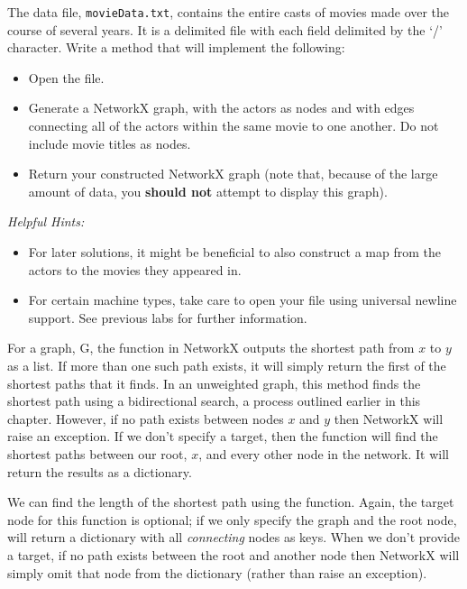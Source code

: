 \begin{problem}
The data file, \texttt{movieData.txt}, contains the entire casts of movies made over the course of several years. It is a delimited file with each field delimited by the `/' character. Write a method that will implement the following:
\begin{itemize}
\item Open the file.
\item Generate a NetworkX graph, with the actors as nodes and with edges connecting all of the actors within the same movie to one another. Do not include movie titles as nodes.
\item Return your constructed NetworkX graph (note that, because of the large amount of data, you \textbf{should not} attempt to display this graph).
\end{itemize}
\emph{Helpful Hints:}
\begin{itemize}
\item For later solutions, it might be beneficial to also construct a map from the actors to the movies they appeared in.
\item For certain machine types, take care to open your file using universal newline support. See previous labs for further information.
\end{itemize}
\end{problem}

For a graph, G, the  function in NetworkX outputs
the shortest path from $x$ to $y$ as a list. If more than one such path exists,
it will simply return the first of the shortest paths that it finds. In an
unweighted graph, this method finds the shortest path using a bidirectional search,
a process outlined earlier in this chapter. However, if no path exists between nodes
$x$ and $y$ then NetworkX will raise an exception. If we don't specify a
target, then the function will find the shortest paths between our root,
$x$, and every other node in the network.  It will return the results as a dictionary.


We can find the length of the shortest path using the 
function. Again, the target node for this function is optional; if we only
specify the graph and the root node,  will return a dictionary
with all \emph{connecting} nodes as keys. When we don't provide a target, if no path exists between the root
and another node then NetworkX will simply omit that node from the dictionary (rather than raise an exception).

